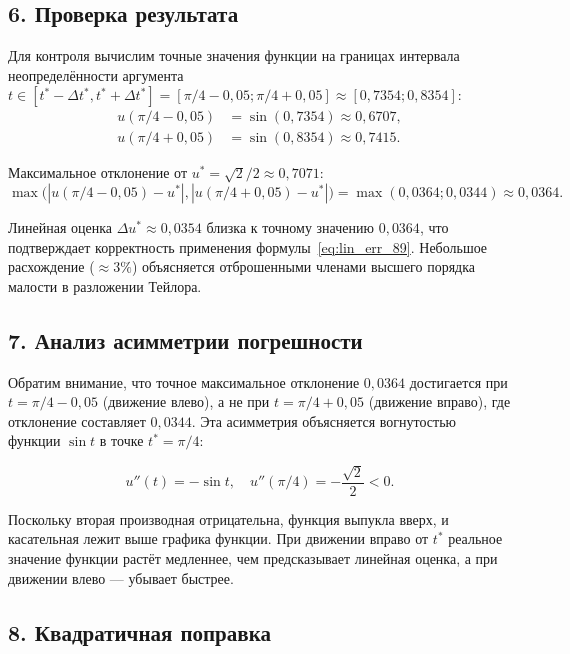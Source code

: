 \documentclass{article}
\begin{document}
\subsection*{6. Проверка результата}

Для контроля вычислим точные значения функции на границах интервала неопределённости аргумента $t \in [t^* - \Delta t^*, t^* + \Delta t^*] = [\pi/4 - 0{,}05; \pi/4 + 0{,}05] \approx [0{,}7354; 0{,}8354]$:
\begin{align}
u(\pi/4 - 0{,}05) &= \sin(0{,}7354) \approx 0{,}6707, \\
u(\pi/4 + 0{,}05) &= \sin(0{,}8354) \approx 0{,}7415.
\end{align}

Максимальное отклонение от $u^* = \sqrt{2}/2 \approx 0{,}7071$:
\begin{equation}
\max\bigl(|u(\pi/4 - 0{,}05) - u^*|, |u(\pi/4 + 0{,}05) - u^*|\bigr) = \max(0{,}0364; 0{,}0344) \approx 0{,}0364.
\end{equation}

Линейная оценка $\Delta u^* \approx 0{,}0354$ близка к точному значению $0{,}0364$, что подтверждает корректность применения формулы~\eqref{eq:lin_err_89}. Небольшое расхождение ($\approx 3\%$) объясняется отброшенными членами высшего порядка малости в разложении Тейлора.

\subsection*{7. Анализ асимметрии погрешности}

Обратим внимание, что точное максимальное отклонение $0{,}0364$ достигается при $t = \pi/4 - 0{,}05$ (движение влево), а не при $t = \pi/4 + 0{,}05$ (движение вправо), где отклонение составляет $0{,}0344$. Эта асимметрия объясняется вогнутостью функции $\sin t$ в точке $t^* = \pi/4$:

\begin{equation}
u''(t) = -\sin t, \quad u''(\pi/4) = -\frac{\sqrt{2}}{2} < 0.
\end{equation}

Поскольку вторая производная отрицательна, функция выпукла вверх, и касательная лежит выше графика функции. При движении вправо от $t^*$ реальное значение функции растёт медленнее, чем предсказывает линейная оценка, а при движении влево --- убывает быстрее.

\subsection*{8. Квадратичная поправка}
\end{document}
